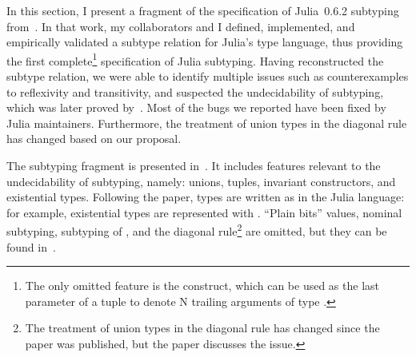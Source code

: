 In this section, I present a fragment of the specification of
Julia~0.6.2 subtyping from~\cite{bib:zappa-nardelli:julia-sub:oopsla:2018}.
In that work, my collaborators and I defined, implemented, and empirically
validated a subtype relation for Julia's type language,
thus providing the first complete\footnote{The only omitted feature is the
 construct, which can be used as the last
parameter of a tuple to denote N trailing arguments of type .}
specification of Julia subtyping.
Having reconstructed the subtype relation,
we were able to identify multiple issues such as
counterexamples to reflexivity and transitivity,
and suspected the undecidability of subtyping,
which was later proved by~\citet{bib:chung:type-julia-thesis:2023}.
Most of the bugs we reported have been fixed by Julia maintainers.
Furthermore, the treatment of union types in the diagonal rule has changed
based on our proposal.

The subtyping fragment is presented in~. 
It includes features relevant to the undecidability of subtyping, namely:
unions, tuples, invariant constructors, and existential types.
Following the paper, types are written as in the Julia language:
for example, existential types are represented with .
``Plain bits'' values, nominal subtyping, 
subtyping of , and the diagonal
rule\footnote{The treatment of union types in the diagonal rule has changed
since the paper was published, but the paper discusses the issue.}
are omitted, but they can be found
in~\cite{bib:zappa-nardelli:julia-sub:oopsla:2018}.

